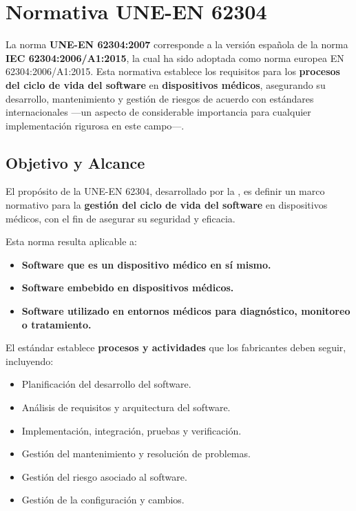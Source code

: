 \chapter{Normativa UNE-EN 62304}\label{ch:regulatory_framework}

La norma \textbf{UNE-EN 62304:2007} \cite{UNE-EN-62304} corresponde a la versión española de la norma \textbf{IEC 62304:2006/A1:2015}, la cual ha sido adoptada como norma europea EN 62304:2006/A1:2015. Esta normativa establece los requisitos para los \textbf{procesos del ciclo de vida del software} en \textbf{dispositivos médicos}, asegurando su desarrollo, mantenimiento y gestión de riesgos de acuerdo con estándares internacionales —un aspecto de considerable importancia para cualquier implementación rigurosa en este campo—.

\section{Objetivo y Alcance}
El propósito de la UNE-EN 62304, desarrollado por la \cite{UNE-EN-62304}, es definir un marco normativo para la \textbf{gestión del ciclo de vida del software} en dispositivos médicos, con el fin de asegurar su seguridad y eficacia.

Esta norma resulta aplicable a:
\begin{itemize}
    \item \textbf{Software que es un dispositivo médico en sí mismo.}
    \item \textbf{Software embebido en dispositivos médicos.}
    \item \textbf{Software utilizado en entornos médicos para diagnóstico, monitoreo o tratamiento.}
\end{itemize}

El estándar establece \textbf{procesos y actividades} que los fabricantes deben seguir, incluyendo:
\begin{itemize}
    \item Planificación del desarrollo del software.
    \item Análisis de requisitos y arquitectura del software.
    \item Implementación, integración, pruebas y verificación.
    \item Gestión del mantenimiento y resolución de problemas.
    \item Gestión del riesgo asociado al software.
    \item Gestión de la configuración y cambios.
\end{itemize}

